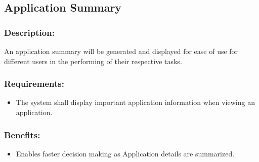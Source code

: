 \documentclass[]{article}
\begin{document}
\subsection{Application Summary}
\subsubsection{ Description: }An application summary will be generated and displayed for ease of use for different users in the performing of their respective tasks.
\subsubsection{ Requirements:}
\begin{itemize}
\item The system shall display important application information when viewing an application.

\end{itemize}
\subsubsection{Benefits:}
\begin{itemize}
	\item Enables faster decision making as Application details are summarized. 
	
\end{itemize}
\end{document}
